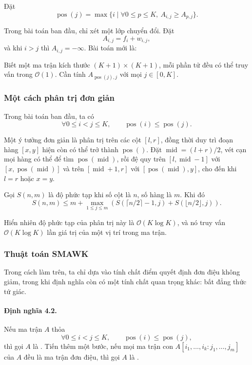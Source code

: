 \documentclass[11pt]{article}
\newcommand{\Oh}{\mathcal{O}}
\begin{document}
Đặt
\[
  \operatorname{pos}(j)=
  \max\{i\mid \forall 0\le p\le K,\ A_{i,j}\ge A_{p,j}\}.
\]

Trong bài toán ban đầu, chỉ xét một lớp chuyển đổi. Đặt
\[
  A_{i,j}=f_i+w_{i,j},
\]
và khi \(i>j\) thì \(A_{i,j}=-\infty\). Bài toán mới là:

Biết một ma trận kích thước \((K+1)\times(K+1)\), mỗi phần tử đều có thể truy
vấn trong \(\Oh(1)\). Cần tính \(A_{\operatorname{pos}(j),j}\) với mọi
\(j\in[0,K]\).

\subsubsection{Một cách phân trị đơn giản}

Trong bài toán ban đầu, ta có
\[
  \forall 0\le i<j\le K,\qquad
  \operatorname{pos}(i)\le \operatorname{pos}(j).
\]

Một ý tưởng đơn giản là phân trị trên các cột \([l,r]\), đồng thời duy trì
đoạn hàng \([x,y]\) hiện còn có thể trở thành \(\operatorname{pos}()\). Đặt
\(\operatorname{mid}=(l+r)/2\), vét cạn mọi hàng có thể để tìm
\(\operatorname{pos}(\operatorname{mid})\), rồi đệ quy trên
\([l,\operatorname{mid}-1]\) với \([x,\operatorname{pos}(\operatorname{mid})]\)
và trên \([\operatorname{mid}+1,r]\) với
\([\operatorname{pos}(\operatorname{mid}),y]\), cho đến khi \(l=r\) hoặc
\(x=y\).

Gọi \(S(n,m)\) là độ phức tạp khi số cột là \(n\), số hàng là \(m\). Khi đó
\[
  S(n,m)\le m+\max_{1\le j\le m}
  \left(S(\lceil n/2\rceil-1,j)+S(\lfloor n/2\rfloor,j)\right).
\]

Hiển nhiên độ phức tạp của phân trị này là \(\Oh(K\log K)\), và nó truy vấn
\(\Oh(K\log K)\) lần giá trị của một vị trí trong ma trận.

\subsubsection{Thuật toán SMAWK}

Trong cách làm trên, ta chỉ dựa vào tính chất điểm quyết định đơn điệu không
giảm, trong khi định nghĩa còn có một tính chất quan trọng khác: bất đẳng thức
tứ giác.

\paragraph{Định nghĩa 4.2.}
Nếu ma trận \(A\) thỏa
\[
  \forall 0\le i<j\le K,\qquad
  \operatorname{pos}(i)\le \operatorname{pos}(j),
\]
thì gọi \(A\) là . Tiến thêm một bước, nếu mọi ma trận
con \(A[i_1,\ldots,i_k:j_1,\ldots,j_m]\) của \(A\) đều là ma trận đơn điệu,
thì gọi \(A\) là .
\end{document}
